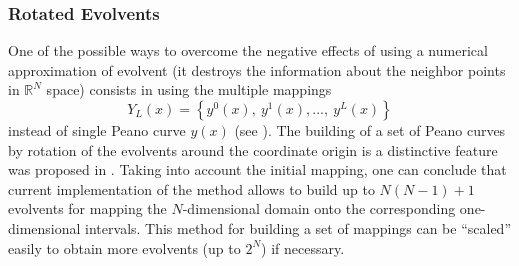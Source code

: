 \documentclass{svproc}
\begin{document}
\subsubsection{Rotated Evolvents}
One of the possible ways to overcome the negative effects of using a numerical
approximation of evolvent (it destroys the information about the neighbor points in
$\mathbb{R}^N$ space)
consists in using the multiple mappings
\begin{equation}
  Y_L(x)=\left\{y^0(x),\ y^1(x),...,\ y^L(x)\right\}
\end{equation}
instead of single Peano curve $y(x)$ (see \cite{strSergGO}).
The building of a set of Peano curves by rotation of the evolvents around the coordinate origin is a
distinctive feature was proposed in \cite{Gergel2009}. Taking into account the initial mapping, one
can conclude that current implementation of the
method allows to build up to $N(N-1)+1$ evolvents for mapping the $N$-dimensional domain
onto the corresponding one-dimensional intervals. This method for building a set of mappings can be
``scaled'' easily to obtain more evolvents (up to
$2^N$) if necessary.
\end{document}
